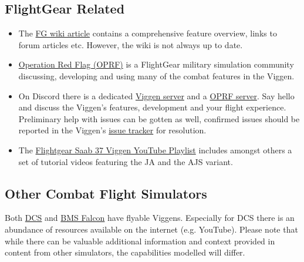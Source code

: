 \subsection{FlightGear Related}
\begin{itemize}
\item The \href{http://wiki.flightgear.org/Saab_37_Viggen}{FG wiki article} contains a comprehensive feature overview, links to forum articles etc. However, the wiki is not always up to date.
\item \href{http://opredflag.com/}{Operation Red Flag (OPRF)} is a FlightGear military simulation community discussing, developing and using many of the combat features in the Viggen.
\item On Discord there is a dedicated \href{https://discord.gg/jc5pSM5}{Viggen server} and a \href{https://discord.gg/SmGFnJN}{OPRF server}. Say hello and discuss the Viggen's features, development and your flight experience. Preliminary help with issues can be gotten as well, confirmed issues should be reported in the Viggen's \href{https://github.com/NikolaiVChr/flightgear-saab-ja-37-viggen/issues}{issue tracker} for resolution.
\item The \href{https://www.youtube.com/playlist?list=PLogi97V-ki0GfCLqimTtIq9RIVcm-GRFE}{Flightgear Saab 37 Viggen YouTube Playlist} includes amongst others a set of tutorial videos featuring the JA and the AJS variant.
\end{itemize}

\subsection{Other Combat Flight Simulators}
Both \href{https://www.digitalcombatsimulator.com/en/index.php}{DCS} and \href{https://www.benchmarksims.org/}{BMS Falcon} have flyable Viggens. Especially for DCS there is an abundance of resources available on the internet (e.g. YouTube). Please note that while there can be valuable additional information and context provided in content from other simulators, the capabilities modelled will differ.

